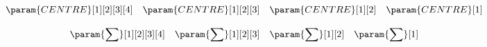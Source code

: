 \documentclass[10pt,a4paper]{article}
\begin{document}
\[
	\param{CENTRE}[1][2][3][4] \quad
	\param{CENTRE}[1][2][3] \quad
	\param{CENTRE}[1][2] \quad
	\param{CENTRE}[1]
\]

\[
	\param{\sum}[1][2][3][4] \quad
	\param{\sum}[1][2][3] \quad
	\param{\sum}[1][2] \quad
	\param{\sum}[1]
\]
\end{document}
